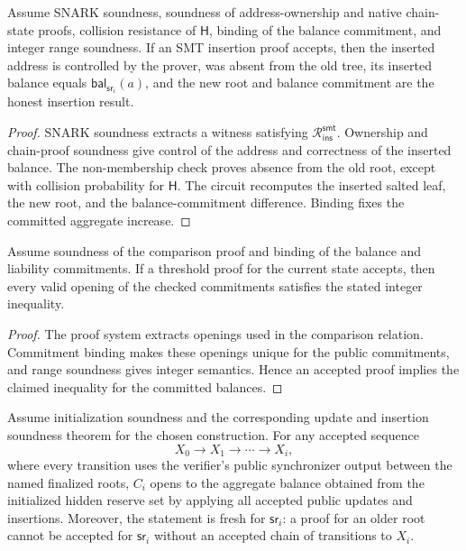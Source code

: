 \documentclass[runningheads]{llncs}
\newcommand{\CRH}{\mathsf{H}}
\newcommand{\bal}{\mathsf{bal}}
\newcommand{\sr}{\mathsf{sr}}
\newcommand{\Rel}{\mathcal{R}}
\begin{document}
\begin{theorem}
Assume SNARK soundness, soundness of address-ownership and native chain-state proofs, collision resistance of \(\CRH\), binding of the balance commitment, and integer range soundness.  If an SMT insertion proof accepts, then the inserted address is controlled by the prover, was absent from the old tree, its inserted balance equals \(\bal_{\sr_i}(a)\), and the new root and balance commitment are the honest insertion result.
\end{theorem}

\begin{proof}
SNARK soundness extracts a witness satisfying \(\Rel_{\mathsf{ins}}^{\mathsf{smt}}\).  Ownership and chain-proof soundness give control of the address and correctness of the inserted balance.  The non-membership check proves absence from the old root, except with collision probability for \(\CRH\).  The circuit recomputes the inserted salted leaf, the new root, and the balance-commitment difference.  Binding fixes the committed aggregate increase.
\end{proof}

\begin{theorem}
Assume soundness of the comparison proof and binding of the balance and liability commitments.  If a threshold proof for the current state accepts, then every valid opening of the checked commitments satisfies the stated integer inequality.
\end{theorem}

\begin{proof}
The proof system extracts openings used in the comparison relation.  Commitment binding makes these openings unique for the public commitments, and range soundness gives integer semantics.  Hence an accepted proof implies the claimed inequality for the committed balances.
\end{proof}

\begin{theorem}
Assume initialization soundness and the corresponding update and insertion soundness theorem for the chosen construction.  For any accepted sequence
\[
        X_0\rightarrow X_1\rightarrow\cdots\rightarrow X_i,
\]
where every transition uses the verifier's public synchronizer output between the named finalized roots, \(C_i\) opens to the aggregate balance obtained from the initialized hidden reserve set by applying all accepted public updates and insertions.  Moreover, the statement is fresh for \(\sr_i\): a proof for an older root cannot be accepted for \(\sr_i\) without an accepted chain of transitions to \(X_i\).
\end{theorem}
\end{document}
